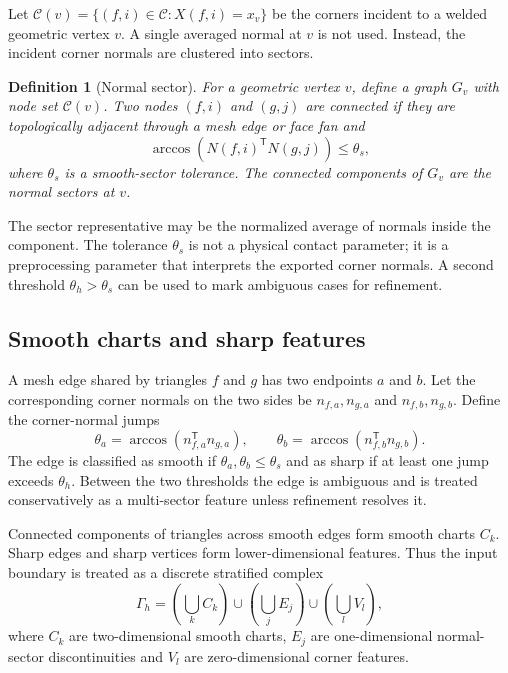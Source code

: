 \documentclass[preprint,12pt,sort&compress]{elsarticle}
\newtheorem{definition}{Definition}
\newcommand{\T}{\mathsf{T}}
\newcommand{\cC}{\mathcal{C}}
\begin{document}
Let $\cC(v)=\{(f,i)\in\cC: X(f,i)=x_v\}$ be the corners incident to a welded geometric vertex $v$. A single averaged normal at $v$ is not used. Instead, the incident corner normals are clustered into sectors.

\begin{definition}[Normal sector]
For a geometric vertex $v$, define a graph $G_v$ with node set $\cC(v)$. Two nodes $(f,i)$ and $(g,j)$ are connected if they are topologically adjacent through a mesh edge or face fan and
\begin{equation}
 \arccos \left(N(f,i)^\T N(g,j)\right) \leq \theta_s,
\label{eq:sector_threshold}
\end{equation}
where $\theta_s$ is a smooth-sector tolerance. The connected components of $G_v$ are the normal sectors at $v$.
\end{definition}

The sector representative may be the normalized average of normals inside the component. The tolerance $\theta_s$ is not a physical contact parameter; it is a preprocessing parameter that interprets the exported corner normals. A second threshold $\theta_h>\theta_s$ can be used to mark ambiguous cases for refinement.

\subsection{Smooth charts and sharp features}

A mesh edge shared by triangles $f$ and $g$ has two endpoints $a$ and $b$. Let the corresponding corner normals on the two sides be $n_{f,a},n_{g,a}$ and $n_{f,b},n_{g,b}$. Define the corner-normal jumps
\begin{equation}
\theta_a = \arccos(n_{f,a}^\T n_{g,a}), \qquad
\theta_b = \arccos(n_{f,b}^\T n_{g,b}).
\end{equation}
The edge is classified as smooth if $\theta_a,\theta_b\leq \theta_s$ and as sharp if at least one jump exceeds $\theta_h$. Between the two thresholds the edge is ambiguous and is treated conservatively as a multi-sector feature unless refinement resolves it.

Connected components of triangles across smooth edges form smooth charts $C_k$. Sharp edges and sharp vertices form lower-dimensional features. Thus the input boundary is treated as a discrete stratified complex
\begin{equation}
 \Gamma_h = \left(\bigcup_k C_k\right) \cup \left(\bigcup_j E_j\right) \cup \left(\bigcup_l V_l\right),
\label{eq:stratified}
\end{equation}
where $C_k$ are two-dimensional smooth charts, $E_j$ are one-dimensional normal-sector discontinuities and $V_l$ are zero-dimensional corner features.
\end{document}
